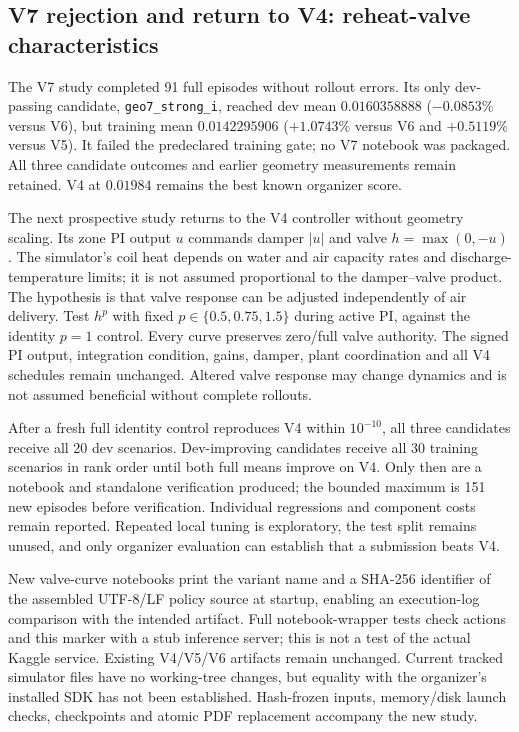\subsection{V7 rejection and return to V4: reheat-valve characteristics}
The V7 study completed 91 full episodes without rollout errors. Its only
dev-passing candidate, \texttt{geo7\_strong\_i}, reached dev mean
$0.0160358888$ ($-0.0853\%$ versus V6), but training mean $0.0142295906$
($+1.0743\%$ versus V6 and $+0.5119\%$ versus V5). It failed the predeclared
training gate; no V7 notebook was packaged. All three candidate outcomes and
earlier geometry measurements remain retained. V4 at $0.01984$ remains the
best known organizer score.

The next prospective study returns to the V4 controller without geometry
scaling. Its zone PI output $u$ commands damper $|u|$ and valve
$h=\max(0,-u)$. The simulator's coil heat depends on water and air capacity
rates and discharge-temperature limits; it is not assumed proportional to
the damper--valve product. The hypothesis is that valve response can be
adjusted independently of air delivery. Test $h^p$ with fixed
$p\in\{0.5,0.75,1.5\}$ during active PI, against the identity $p=1$ control.
Every curve preserves zero/full valve authority. The signed PI output,
integration condition, gains, damper, plant coordination and all V4 schedules
remain unchanged. Altered valve response may change dynamics and is not
assumed beneficial without complete rollouts.

After a fresh full identity control reproduces V4 within $10^{-10}$,
all three candidates receive all 20 dev scenarios. Dev-improving candidates
receive all 30 training scenarios in rank order until both full means improve
on V4. Only then are a notebook and standalone verification produced; the
bounded maximum is 151 new episodes before verification. Individual regressions
and component costs remain reported. Repeated local tuning is exploratory,
the test split remains unused, and only organizer evaluation can establish
that a submission beats V4.

New valve-curve notebooks print the variant name and a SHA-256 identifier of
the assembled UTF-8/LF policy source at startup, enabling an execution-log
comparison with the intended artifact. Full notebook-wrapper tests check
actions and this marker with a stub inference server; this is not a test of
the actual Kaggle service. Existing V4/V5/V6 artifacts remain unchanged.
Current tracked simulator files have no working-tree changes, but equality
with the organizer's installed SDK has not been established. Hash-frozen
inputs, memory/disk launch checks, checkpoints and atomic PDF replacement
accompany the new study.

